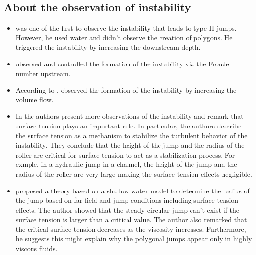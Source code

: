 \documentclass[english,11pt]{article}
\let\cite=\citet
\numberwithin{remark}{subsection}
\begin{document}
\subsection{About the observation of instability}
\begin{itemize}
\item \cite{craik1981circular} was one of the first to observe the instability that leads to type II jumps.
  However, he used water and didn't observe the creation of polygons.
  He triggered the instability by increasing the downstream depth.

\item \cite{ishigai1977heat} observed and controlled the formation of the instability via the Froude number upstream.
  
\item According to \cite{liu1993hydraulic}, \cite{errico1986study} observed the formation of the instability
  by increasing the volume flow.

\item In \cite{liu1993hydraulic} the authors present more observations of the instability and remark that
  surface tension plays an important role. In particular, the authors describe the surface tension as a
  mechanism to stabilize the turbulent behavior of the instability. 
  They conclude that the height of the jump and the radius of the roller are critical for surface tension to act as
  a stabilization process. For exmple, in a hydraulic jump in a channel, the height of the jump and the radius of the roller
  are very large making the surface tension effects negligible. 

\item \cite{kasimov2008stationary} proposed a theory based on a shallow water model to determine the radius of the jump
  based on far-field and jump conditions including surface tension effects. The author showed that the steady circular
  jump can't exist if the surface tension is larger than a critical value.
  The author also remarked that the critical surface tension decreases as the viscosity increases.
  Furthermore, he suggests this might explain why the polygonal jumps appear only in highly viscous fluids. 
\end{itemize}
\end{document}
